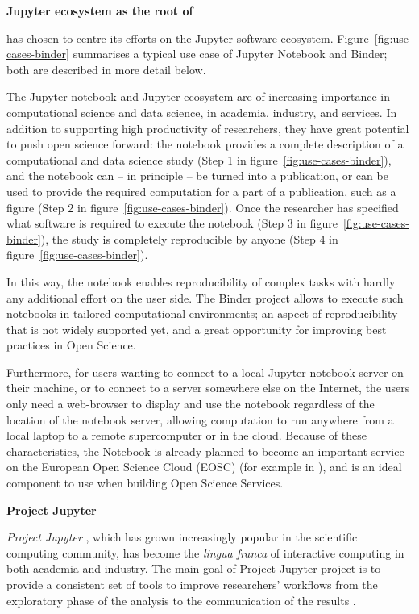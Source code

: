 \noindent\textbf{Jupyter ecosystem as the root of \TheProject}


\TheProject has chosen to centre its efforts on the Jupyter software
ecosystem. Figure~\ref{fig:use-cases-binder} summarises a typical use
case of Jupyter Notebook and Binder; both are described in more detail
below.

The Jupyter notebook and Jupyter ecosystem are of increasing
importance in computational science and data science, in academia,
industry, and services. In addition to supporting high productivity of
researchers, they have great potential to push open science forward:
the notebook provides a complete description of a computational and
data science study (Step 1 in figure~\ref{fig:use-cases-binder}), and the notebook can -- in principle -- be turned
into a publication, or can be used to provide the required computation
for a part of a publication, such as a figure
(Step 2 in figure~\ref{fig:use-cases-binder}). Once the researcher has
specified what software is required to execute the notebook (Step 3
in figure~\ref{fig:use-cases-binder}), the study is completely
reproducible by anyone (Step 4 in figure~\ref{fig:use-cases-binder}).

In this way, the notebook enables reproducibility of complex tasks
with hardly any additional effort on the user side.
The Binder project allows to execute such notebooks in
tailored computational environments; an aspect of reproducibility that
is not widely supported yet,
and a great opportunity for improving best practices in Open Science.

Furthermore, for users wanting to connect
to a local Jupyter notebook server on their machine, or to connect to
a server somewhere else on the Internet, the users only need a
web-browser to display and use the notebook regardless of the location
of the notebook server,
allowing computation to run anywhere from a local laptop to a remote supercomputer or in the cloud.
Because of these characteristics,
the Notebook is already planned to become an
important service on the European Open Science Cloud (EOSC) (for
example in \cite{panosc}),
and is an ideal component to use when building Open Science Services.

\medskip\noindent\textbf{Project Jupyter}

\emph{Project Jupyter} \cite{Jupyter}, which has grown increasingly popular in the scientific
computing community, has become the \emph{lingua franca} of interactive
computing in both academia and industry. The main goal of Project Jupyter
project is to provide a consistent set of tools to improve researchers'
workflows from the exploratory phase of the analysis to the communication
of the results \cite{Kluyver2016}.

